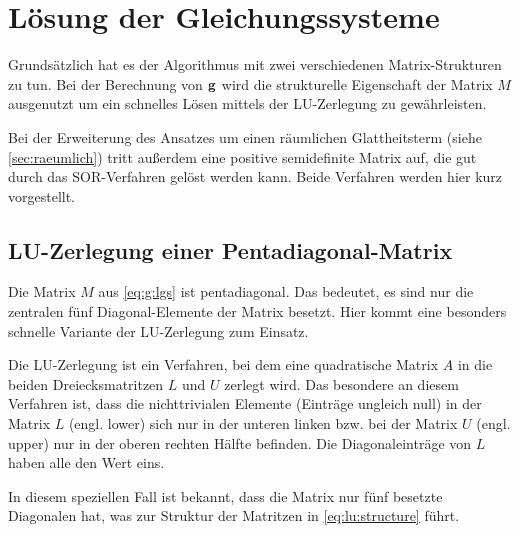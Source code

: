 \section{Lösung der Gleichungssysteme}
\label{sec:solvers}
Grundsätzlich hat es der Algorithmus mit zwei verschiedenen Matrix-Strukturen zu tun. Bei der Berechnung von $\mathbf g$ wird die strukturelle Eigenschaft der Matrix $M$ ausgenutzt um ein schnelles Lösen mittels der LU-Zerlegung zu gewährleisten.

Bei der Erweiterung des Ansatzes um einen räumlichen Glattheitsterm (siehe \autoref{sec:raeumlich}) tritt außerdem eine positive semidefinite Matrix auf, die gut durch das \gls{SOR}-Verfahren gelöst werden kann. Beide Verfahren werden hier kurz vorgestellt.



\subsection{LU-Zerlegung einer Pentadiagonal-Matrix}
\label{sec:maths:lu}
Die Matrix $M$ aus \autoref{eq:g:lgs} ist pentadiagonal. Das bedeutet, es sind nur die zentralen fünf Diagonal-Elemente der Matrix besetzt. Hier kommt eine besonders schnelle Variante der LU-Zerlegung zum Einsatz.

Die LU-Zerlegung ist ein Verfahren, bei dem eine quadratische Matrix $A$ in die beiden Dreiecksmatritzen $L$ und $U$ zerlegt wird. Das besondere an diesem Verfahren ist, dass die nichttrivialen Elemente (Einträge ungleich null) in der Matrix $L$ (engl. lower) sich nur in der unteren linken bzw. bei der Matrix $U$ (engl. upper) nur in der oberen rechten Hälfte befinden. Die Diagonaleinträge von $L$ haben alle den Wert eins. 

In diesem speziellen Fall ist bekannt, dass die Matrix nur fünf besetzte Diagonalen hat, was zur Struktur der Matritzen in \autoref{eq:lu:structure} führt.

